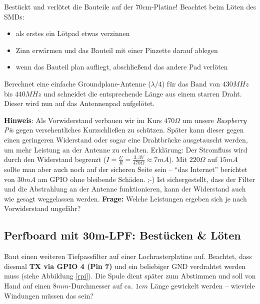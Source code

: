 Bestückt und verlötet die Bauteile auf der 70cm-Platine! Beachtet beim Löten des SMDs:

\begin{itemize}
    \item als erstes ein Lötpad etwas verzinnen
    \item Zinn erwärmen und das Bauteil mit einer Pinzette darauf ablegen
    \item wenn das Bauteil plan aufliegt, abschließend das andere Pad verlöten
\end{itemize}

Berechnet eine einfache Groundplane-Antenne ($\lambda/4$) für das Band von $430
MHz$ bis $440 MHz$ und schneidet die entsprechende Länge aus einem starren
Draht. Dieser wird nun auf das Antennenpad aufgelötet.

\textbf{Hinweis}: Als Vorwiderstand verbauen wir im Kurs $470 \Omega$ um unsere
\emph{Raspberry Pi}s gegen versehentliches Kurzschließen zu schützen. Später kann dieser
gegen einen geringeren Widerstand oder sogar eine Drahtbrücke ausgetauscht
werden, um mehr Leistung an der Antenne zu erhalten. Erklärung: Der Stromfluss
wird durch den Widerstand begrenzt ($I = \frac{U}{R} = \frac{3,3 V}{470 \Omega}
\approx 7 mA$). Mit $220 \Omega$ auf $15 mA$ sollte man aber auch noch auf der
sicheren Seite sein -- "`das Internet"' berichtet von $30 mA$ am GPIO ohne
bleibende Schäden. ;-) Ist sichergestellt, dass der Filter und die Abstrahlung
an der Antenne funktionieren, kann der Widerstand auch wie gesagt weggelassen
werden. \textbf{Frage:} Welche Leistungen ergeben sich je nach Vorwiderstand
ungefähr?


\subsection*{Perfboard mit 30m-LPF: Bestücken \& Löten}

Baut einen weiteren Tiefpassfilter auf einer Lochrasterplatine auf. Beachtet,
dass diesmal \textbf{TX via GPIO 4 (Pin 7)} und ein beliebiger GND verdrahtet
werden muss (siehe Abbildung \ref{rpi}). Die Spule dient später zum Abstimmen
und soll von Hand auf einen $8mm$-Durchmesser auf ca. $1cm$ Länge gewickelt
werden -- wieviele Windungen müssen das sein?

